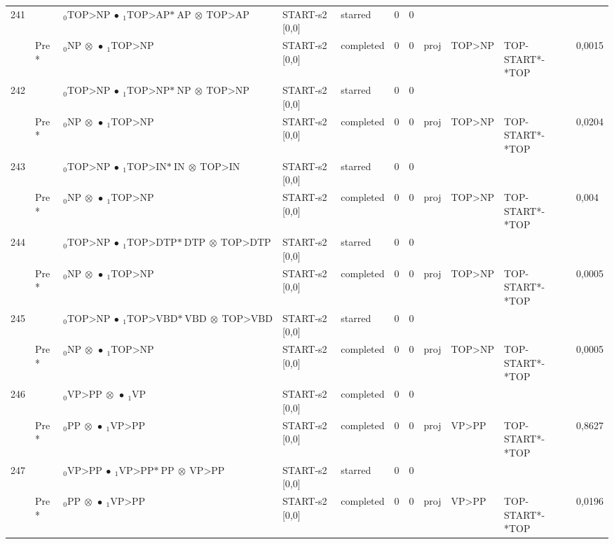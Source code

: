 \documentclass[10pt]{article}
\begin{document}
\begin{longtable}[htbp]{lllllllllll}
241 & & $ {}_0 \textrm{TOP>NP} \  \bullet \ {}_{1} \textrm{TOP>AP*} \ \textrm{AP} \  \otimes \ \textrm{TOP>AP} $ & START-s2 [0,0] & starred & 0 & 0 & & & & \\ 
 & Pre *& $ {}_0 \textrm{NP} \  \otimes \  \bullet \ {}_{1} \textrm{TOP>NP} $ & START-s2 [0,0] & completed & 0 & 0 & proj & TOP>NP & TOP-START*-*TOP & 0,0015 \\ 
242 & & $ {}_0 \textrm{TOP>NP} \  \bullet \ {}_{1} \textrm{TOP>NP*} \ \textrm{NP} \  \otimes \ \textrm{TOP>NP} $ & START-s2 [0,0] & starred & 0 & 0 & & & & \\ 
 & Pre *& $ {}_0 \textrm{NP} \  \otimes \  \bullet \ {}_{1} \textrm{TOP>NP} $ & START-s2 [0,0] & completed & 0 & 0 & proj & TOP>NP & TOP-START*-*TOP & 0,0204 \\ 
243 & & $ {}_0 \textrm{TOP>NP} \  \bullet \ {}_{1} \textrm{TOP>IN*} \ \textrm{IN} \  \otimes \ \textrm{TOP>IN} $ & START-s2 [0,0] & starred & 0 & 0 & & & & \\ 
 & Pre *& $ {}_0 \textrm{NP} \  \otimes \  \bullet \ {}_{1} \textrm{TOP>NP} $ & START-s2 [0,0] & completed & 0 & 0 & proj & TOP>NP & TOP-START*-*TOP & 0,004 \\ 
244 & & $ {}_0 \textrm{TOP>NP} \  \bullet \ {}_{1} \textrm{TOP>DTP*} \ \textrm{DTP} \  \otimes \ \textrm{TOP>DTP} $ & START-s2 [0,0] & starred & 0 & 0 & & & & \\ 
 & Pre *& $ {}_0 \textrm{NP} \  \otimes \  \bullet \ {}_{1} \textrm{TOP>NP} $ & START-s2 [0,0] & completed & 0 & 0 & proj & TOP>NP & TOP-START*-*TOP & 0,0005 \\ 
245 & & $ {}_0 \textrm{TOP>NP} \  \bullet \ {}_{1} \textrm{TOP>VBD*} \ \textrm{VBD} \  \otimes \ \textrm{TOP>VBD} $ & START-s2 [0,0] & starred & 0 & 0 & & & & \\ 
 & Pre *& $ {}_0 \textrm{NP} \  \otimes \  \bullet \ {}_{1} \textrm{TOP>NP} $ & START-s2 [0,0] & completed & 0 & 0 & proj & TOP>NP & TOP-START*-*TOP & 0,0005 \\ 
246 & & $ {}_0 \textrm{VP>PP} \  \otimes \  \bullet \ {}_{1} \textrm{VP} $ & START-s2 [0,0] & completed & 0 & 0 & & & & \\ 
 & Pre *& $ {}_0 \textrm{PP} \  \otimes \  \bullet \ {}_{1} \textrm{VP>PP} $ & START-s2 [0,0] & completed & 0 & 0 & proj & VP>PP & TOP-START*-*TOP & 0,8627 \\ 
247 & & $ {}_0 \textrm{VP>PP} \  \bullet \ {}_{1} \textrm{VP>PP*} \ \textrm{PP} \  \otimes \ \textrm{VP>PP} $ & START-s2 [0,0] & starred & 0 & 0 & & & & \\ 
 & Pre *& $ {}_0 \textrm{PP} \  \otimes \  \bullet \ {}_{1} \textrm{VP>PP} $ & START-s2 [0,0] & completed & 0 & 0 & proj & VP>PP & TOP-START*-*TOP & 0,0196 \\ 

\end{longtable}
\end{document}
